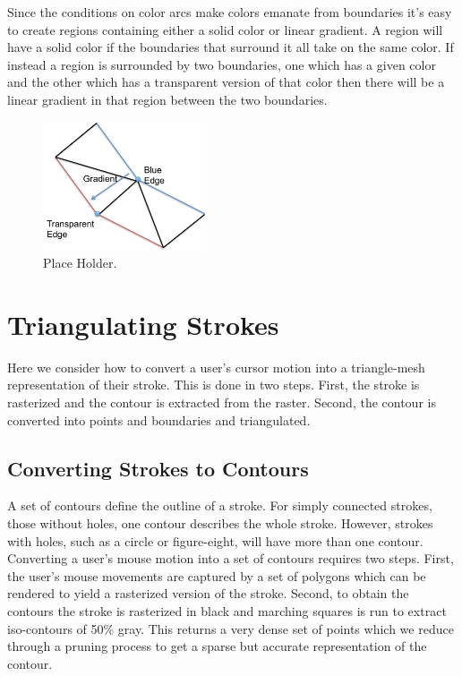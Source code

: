 \documentclass[conference]{acmsiggraph}
\begin{document}
Since the conditions on color arcs make colors emanate from boundaries it's easy to create regions
containing either a solid color or linear gradient. A region will have a solid color if the
boundaries that surround it all take on the same color. If instead a region is surrounded by
two boundaries, one which has a given color and the other which has a transparent version of that color
then there will be a linear gradient in that region between the two boundaries.

\begin{figure}
    \centering
        \includegraphics[height=1.5in]{images/softstrokeboundaryedges}
    \caption{Place Holder.}
\end{figure}

\section{Triangulating Strokes}

Here we consider how to convert a user's cursor motion into a triangle-mesh representation
of their stroke. This is done in two steps. First, the stroke is rasterized and the
contour is extracted from the raster. Second, the contour is converted into points and
boundaries and triangulated.

\subsection{Converting Strokes to Contours}
A set of contours define the outline of a stroke. For simply connected strokes, those without holes, 
one contour describes the whole stroke. However, strokes with holes, such as a circle or 
figure-eight, will have more than one contour.
Converting a user's mouse motion into a set of contours requires two steps.
First, the user's mouse movements are captured by a set of polygons which can be
rendered to yield a rasterized version of the stroke.
Second, to obtain the contours the stroke is rasterized in black and marching squares
is run to extract iso-contours of 50\% gray. This returns a very dense set of points 
which we reduce through a pruning process to
get a sparse but accurate representation of the contour.
\end{document}

